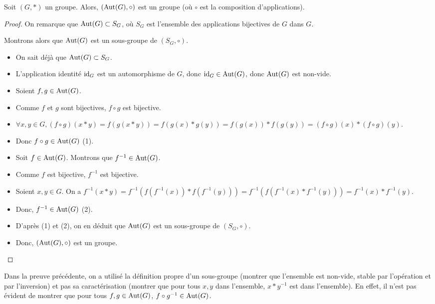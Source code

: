 \documentclass[12pt, a4paper]{report}
\begin{document}
\begin{property}
    Soit $(G,*)$ un groupe. Alors, $(\mathrm{Aut}(G),\circ)$ est un groupe (où $\circ$ est la composition d'applications).
\end{property}

\begin{proof}
    On remarque que $\mathrm{Aut}(G) \subset S_G$, où $S_G$ est l'ensemble des applications bijectives de $G$ dans $G$.

    Montrons alors que $\mathrm{Aut}(G)$ est un sous-groupe de $(S_G,\circ)$.

    \begin{itemize}
        \item On sait déjà que $\mathrm{Aut}(G) \subset S_G$.
        \item L'application identité $\mathrm{id}_G$ est un automorphisme de $G$, donc $\mathrm{id}_G \in \mathrm{Aut}(G)$, donc $\mathrm{Aut}(G)$ est non-vide.
        \item Soient $f,g \in \mathrm{Aut}(G)$.
        \item Comme $f$ et $g$ sont bijectives, $f \circ g$ est bijective.
        \item $\forall x,y \in G, (f \circ g)(x * y) = f(g(x * y)) = f(g(x) * g(y)) = f(g(x)) * f(g(y)) = (f \circ g)(x) * (f \circ g)(y)$.
        \item Donc $f \circ g \in \mathrm{Aut}(G)$ (1).
        \item Soit $f \in \mathrm{Aut}(G)$. Montrons que $f^{-1} \in \mathrm{Aut}(G)$.
        \item Comme $f$ est bijective, $f^{-1}$ est bijective.
        \item Soient $x,y \in G$. On a $f^{-1}(x * y) = f^{-1}(f(f^{-1}(x)) * f(f^{-1}(y))) = f^{-1}(f(f^{-1}(x) * f^{-1}(y))) = f^{-1}(x) * f^{-1}(y)$.
        \item Donc, $f^{-1} \in \mathrm{Aut}(G)$ (2).
        \item D'après (1) et (2), on en déduit que $\mathrm{Aut}(G)$ est un sous-groupe de $(S_G,\circ)$.
        \item Donc, $(\mathrm{Aut}(G),\circ)$ est un groupe.
    \end{itemize}
\end{proof}

\begin{attention}
    Dans la preuve précédente, on a utilisé la définition propre d'un sous-groupe (montrer que l'ensemble est non-vide, stable par l'opération et par l'inversion) et pas sa caractérisation (montrer que pour tous $x,y$ dans l'ensemble, $x*y^{-1}$ est dans l'ensemble). En effet, il n'est pas évident de montrer que pour tous $f,g \in \mathrm{Aut}(G)$, $f \circ g^{-1} \in \mathrm{Aut}(G)$.
\end{attention}
\end{document}
